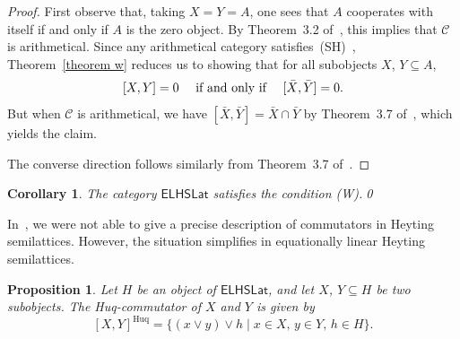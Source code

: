 \documentclass[reqno,a4paper]{amsart}
\newtheorem{proposition}[lemma]{Proposition}
\newtheorem{corollary}[lemma]{Corollary}
\theoremstyle{remark}
\theoremstyle{definition}
\newcommand{\noproof}{\hfill \qed}
\newcommand{\SH}{{\rm (SH)}}
\newcommand{\W}{{\rm (W)}}
\newcommand{\oleq}{\subseteq} %
\newcommand{\omeet}{\cap} %
\newcommand{\ELHSLat}{\ensuremath{\mathsf{ELHSLat}}}
\DeclareMathOperator{\Huq}{Huq}
\newcommand{\C}{\ensuremath{\mathcal{C}}}
\begin{document}
\begin{proof}
	First observe that, taking \(X = Y = A\), one sees that \(A\) cooperates with itself if and only if \(A\) is the zero object. By Theorem~3.2 of~\cite{HSLat}, this implies that \(\C\) is arithmetical. Since any arithmetical category satisfies~\SH{}~\cite{MFVdL3}, Theorem~\ref{theorem w} reduces us to showing that for all subobjects \(X\), \(Y \oleq A\),
	\[
		\text{\([X,Y] = 0\) \quad if and only if \(\quad [\bar X, \bar Y] = 0\).}
	\]
	But when \(\C\) is arithmetical, we have \([\bar X,\bar Y] = \bar X \omeet \bar Y\) by Theorem~3.7 of~\cite{HSLat}, which yields the claim.

	The converse direction follows similarly from Theorem~3.7 of~\cite{HSLat}.
\end{proof}




\begin{corollary}
	The category \(\ELHSLat\) satisfies the condition \W{}.\noproof
\end{corollary}

In~\cite{HSLat}, we were not able to give a precise description of commutators in Heyting semilattices.
However, the situation simplifies in equationally linear Heyting semilattices.

\begin{proposition}
	Let \(H\) be an object of \(\ELHSLat\), and let \(X\), \(Y \oleq H\) be two subobjects. The Huq-commutator of \(X\) and \(Y\) is given by
	\[
		[X,Y]^{\Huq} = \bigl\lbrace (x \vee y) \vee h \;\big|\; x \in X,\, y \in Y,\, h \in H \bigr\rbrace.
	\]
\end{proposition}
\end{document}
